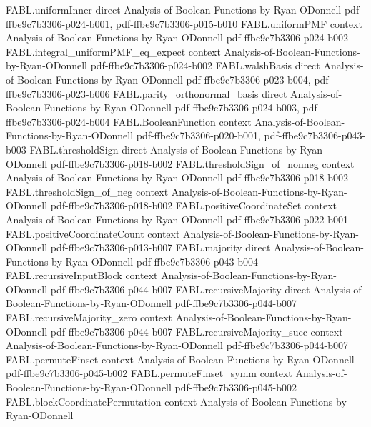 \begin{theorem}
\proofstep
  {FABL.uniformInner}
  {direct}
  {Analysis-of-Boolean-Functions-by-Ryan-ODonnell}
  {pdf-ffbe9c7b3306-p024-b001,
    pdf-ffbe9c7b3306-p015-b010}
\proofstep
  {FABL.uniformPMF}
  {context}
  {Analysis-of-Boolean-Functions-by-Ryan-ODonnell}
  {pdf-ffbe9c7b3306-p024-b002}
\proofstep
  {FABL.integral_uniformPMF_eq_expect}
  {context}
  {Analysis-of-Boolean-Functions-by-Ryan-ODonnell}
  {pdf-ffbe9c7b3306-p024-b002}
\proofstep
  {FABL.walshBasis}
  {direct}
  {Analysis-of-Boolean-Functions-by-Ryan-ODonnell}
  {pdf-ffbe9c7b3306-p023-b004,
    pdf-ffbe9c7b3306-p023-b006}
\proofstep
  {FABL.parity_orthonormal_basis}
  {direct}
  {Analysis-of-Boolean-Functions-by-Ryan-ODonnell}
  {pdf-ffbe9c7b3306-p024-b003,
    pdf-ffbe9c7b3306-p024-b004}
\proofstep
  {FABL.BooleanFunction}
  {context}
  {Analysis-of-Boolean-Functions-by-Ryan-ODonnell}
  {pdf-ffbe9c7b3306-p020-b001,
    pdf-ffbe9c7b3306-p043-b003}
\proofstep
  {FABL.thresholdSign}
  {direct}
  {Analysis-of-Boolean-Functions-by-Ryan-ODonnell}
  {pdf-ffbe9c7b3306-p018-b002}
\proofstep
  {FABL.thresholdSign_of_nonneg}
  {context}
  {Analysis-of-Boolean-Functions-by-Ryan-ODonnell}
  {pdf-ffbe9c7b3306-p018-b002}
\proofstep
  {FABL.thresholdSign_of_neg}
  {context}
  {Analysis-of-Boolean-Functions-by-Ryan-ODonnell}
  {pdf-ffbe9c7b3306-p018-b002}
\proofstep
  {FABL.positiveCoordinateSet}
  {context}
  {Analysis-of-Boolean-Functions-by-Ryan-ODonnell}
  {pdf-ffbe9c7b3306-p022-b001}
\proofstep
  {FABL.positiveCoordinateCount}
  {context}
  {Analysis-of-Boolean-Functions-by-Ryan-ODonnell}
  {pdf-ffbe9c7b3306-p013-b007}
\proofstep
  {FABL.majority}
  {direct}
  {Analysis-of-Boolean-Functions-by-Ryan-ODonnell}
  {pdf-ffbe9c7b3306-p043-b004}
\proofstep
  {FABL.recursiveInputBlock}
  {context}
  {Analysis-of-Boolean-Functions-by-Ryan-ODonnell}
  {pdf-ffbe9c7b3306-p044-b007}
\proofstep
  {FABL.recursiveMajority}
  {direct}
  {Analysis-of-Boolean-Functions-by-Ryan-ODonnell}
  {pdf-ffbe9c7b3306-p044-b007}
\proofstep
  {FABL.recursiveMajority_zero}
  {context}
  {Analysis-of-Boolean-Functions-by-Ryan-ODonnell}
  {pdf-ffbe9c7b3306-p044-b007}
\proofstep
  {FABL.recursiveMajority_succ}
  {context}
  {Analysis-of-Boolean-Functions-by-Ryan-ODonnell}
  {pdf-ffbe9c7b3306-p044-b007}
\proofstep
  {FABL.permuteFinset}
  {context}
  {Analysis-of-Boolean-Functions-by-Ryan-ODonnell}
  {pdf-ffbe9c7b3306-p045-b002}
\proofstep
  {FABL.permuteFinset_symm}
  {context}
  {Analysis-of-Boolean-Functions-by-Ryan-ODonnell}
  {pdf-ffbe9c7b3306-p045-b002}
\proofstep
  {FABL.blockCoordinatePermutation}
  {context}
  {Analysis-of-Boolean-Functions-by-Ryan-ODonnell}

\end{theorem}
